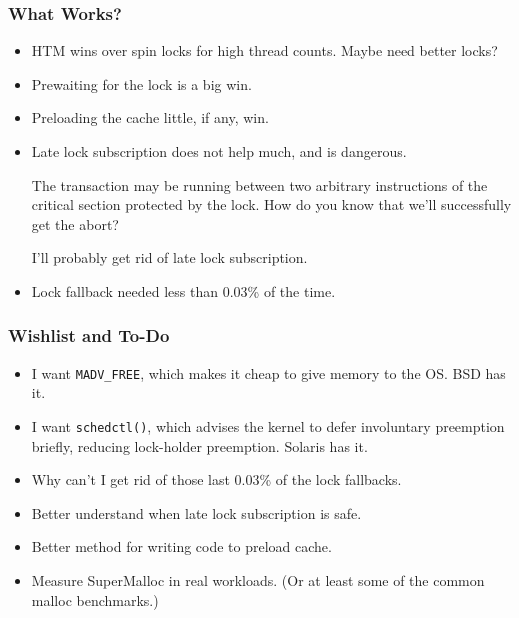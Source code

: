 \documentclass[xcolor=dvipsnames,14pt]{beamer}
\begin{document}
\begin{frame}
\frametitle{What Works?}

\begin{itemize}
\item HTM wins over spin locks for high thread counts.  Maybe need better locks?
\item Prewaiting for the lock is a big win.
\item Preloading the cache little, if any, win.
\item Late lock subscription does not help much, and is dangerous.  

The transaction may be running between two arbitrary instructions of
the critical section protected by the lock.  How do you know that
we'll successfully get the abort?

I'll probably get rid of late lock subscription.
\item Lock fallback needed less than 0.03\% of the time.
\end{itemize}
\end{frame}

\begin{frame}
\frametitle{Wishlist and To-Do}

\begin{itemize}
\item I want \texttt{MADV_FREE}, which makes it cheap to give memory to the OS\@.  BSD has it.
\item I want \texttt{schedctl()}, which advises the kernel to defer
  involuntary preemption briefly, reducing lock-holder preemption.  Solaris has it.
\item Why can't I get rid of those last 0.03\% of the lock fallbacks.
\item Better understand when late lock subscription is safe.
\item Better method for writing code to preload cache.
\item Measure SuperMalloc in real workloads.  (Or at least some of the
  common malloc benchmarks.)
\end{itemize}

\end{frame}
\end{document}
